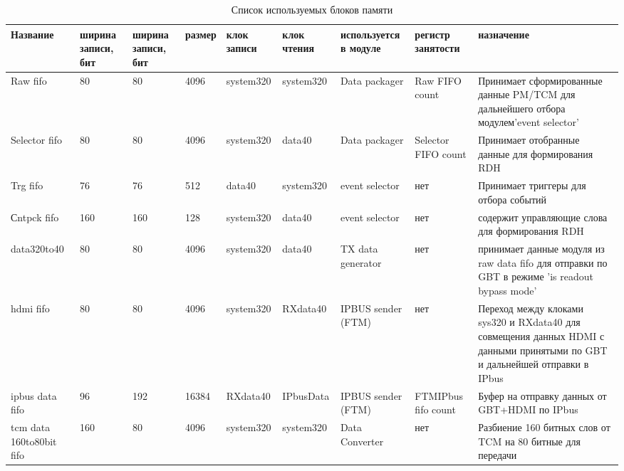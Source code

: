 \documentclass{article}
\begin{document}
\begin{table}[H]
\begin{tabularx}{1\textwidth}{|p{}|p{1cm}|p{1cm}|p{1cm}|p{}|p{}|p{}|p{}|X|}
\hline
Название & ширина записи, бит & ширина записи, бит & размер & клок записи & клок чтения & используется в модуле & регистр занятости & назначение \\ \hline

Raw fifo & 80 & 80 & 4096 & system320 & system320 & Data packager & Raw FIFO count & Принимает сформированные данные PM/TCM для дальнейшего отбора модулем'event selector' \\ \hline

Selector fifo & 80 & 80 & 4096 & system320 & data40 & Data packager & Selector FIFO count & Принимает отобранные данные для формирования RDH \\ \hline

Trg fifo & 76 & 76 & 512 & data40 & system320 & event selector & нет & Принимает триггеры для отбора событий \\ \hline

Сntpck fifo & 160 & 160 & 128 & system320 & data40 & event selector & нет & содержит управляющие слова для формирования RDH \\ \hline

data320to40 & 80 & 80 & 4096 & system320 & data40 & TX data generator & нет & принимает данные модуля из raw data fifo для отправки по GBT в режиме 'is readout bypass mode' \\ \hline

hdmi fifo & 80 & 80 & 4096 & system320 & RXdata40 & IPBUS sender (FTM) & нет & Переход между клоками sys320 и RXdata40 для совмещения данных HDMI с данными принятыми по GBT и дальнейшей отправки в IPbus \\ \hline

ipbus data fifo & 96 & 192 & 16384 & RXdata40 & IPbusData & IPBUS sender (FTM) & FTMIPbus fifo count & Буфер на отправку данных от GBT+HDMI по IPbus \\ \hline

tcm data 160to80bit fifo & 160 & 80 & 4096 & system320 & system320 & Data Converter & нет & Разбиение 160 битных слов от TCM на 80 битные для передачи \\ \hline
\end{tabularx}
\caption{Список используемых блоков памяти\label{tab0}}
\end{table}
\end{document}
